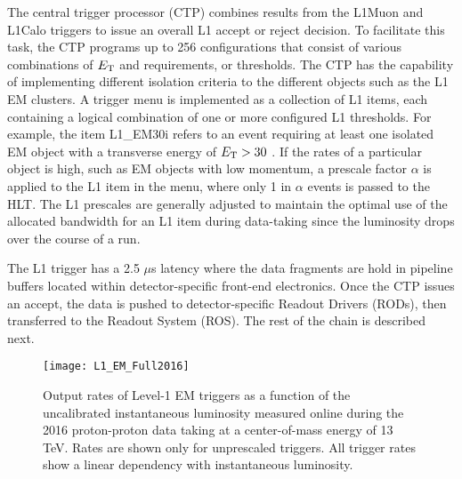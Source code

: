 The central trigger processor (CTP) combines results from the L1Muon and L1Calo
triggers to issue an overall L1 accept or reject decision.
To facilitate this task, the CTP programs up to 256 configurations that 
consist of various combinations of $E_{\rm{T}}$ and \pt requirements, 
or thresholds.
The CTP has the capability of implementing different isolation criteria 
to the different objects such as the L1 EM clusters. 
A trigger menu is implemented as a collection of L1 items, each containing a 
logical combination of one or more configured L1 thresholds. 
For example, the item L1\_EM30i refers to an event requiring at least one 
isolated EM object with a transverse energy of $E_{\rm{T}} > 30$ \GeV. 
If the rates of a particular 
object is high, such as EM objects with low momentum, a prescale factor $\alpha$ is applied to the L1 item in the menu, where only 1 in $\alpha$
events is passed to the HLT. The L1 prescales are generally adjusted to 
maintain the optimal use of the allocated bandwidth for an L1 item during 
data-taking since the luminosity drops over the course of a run.

The L1 trigger has a 2.5 $\mu$s latency where the data fragments are 
hold in pipeline buffers located within detector-specific front-end 
electronics. 
Once the CTP issues an accept, the data is pushed to detector-specific 
Readout Drivers (RODs), then transferred to the Readout System (ROS). 
The rest of the chain is described next. 

\begin{figure}[t!]
\centering
\texttt{[image: L1\_EM\_Full2016]}
\caption{Output rates of Level-1 EM triggers as a function of the uncalibrated instantaneous luminosity measured online during the 2016 proton-proton data taking at a center-of-mass energy of 13 TeV.
Rates are shown only for unprescaled triggers. All trigger rates show a linear dependency with instantaneous luminosity.}
\label{fig:}
\end{figure} 




